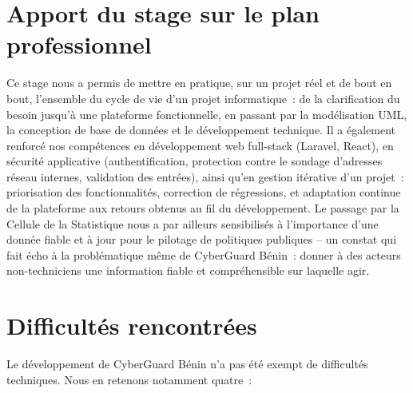 \section{Apport du stage sur le plan professionnel}

Ce stage nous a permis de mettre en pratique, sur un projet r\'eel et de bout en
bout, l'ensemble du cycle de vie d'un projet informatique~: de la clarification
du besoin jusqu'\`a une plateforme fonctionnelle, en passant par la
mod\'elisation UML, la conception de base de donn\'ees et le d\'eveloppement
technique. Il a \'egalement renforc\'e nos comp\'etences en d\'eveloppement web
full-stack (Laravel, React), en s\'ecurit\'e applicative (authentification,
protection contre le sondage d'adresses r\'eseau internes, validation des
entr\'ees), ainsi qu'en gestion it\'erative d'un projet~: priorisation des
fonctionnalit\'es, correction de r\'egressions, et adaptation continue de la
plateforme aux retours obtenus au fil du d\'eveloppement. Le passage par la
Cellule de la Statistique nous a par ailleurs sensibilis\'es \`a l'importance
d'une donn\'ee fiable et \`a jour pour le pilotage de politiques publiques -- un
constat qui fait \'echo \`a la probl\'ematique m\^eme de CyberGuard B\'enin~: donner
\`a des acteurs non-techniciens une information fiable et compr\'ehensible sur
laquelle agir.

\section{Difficult\'es rencontr\'ees}

Le d\'eveloppement de CyberGuard B\'enin n'a pas \'et\'e exempt de difficult\'es
techniques. Nous en retenons notamment quatre~:

